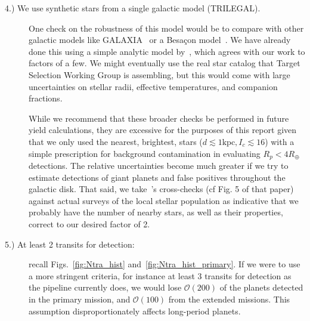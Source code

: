 \begin{description}
	
	\item[4.) We use synthetic stars from a single galactic model (TRILEGAL).]
	One check on the robustness of this model would be to compare with other galactic models like GALAXIA~\citep{sharma_galaxia_2011} or a Besa\c con model~\citep{robin2003synthetic}.
	We have already done this using a simple analytic model by~\citet{winn_searchable_2013}, which agrees with our work to factors of a few.
	We might eventually use the real star catalog that \tesss Target Selection Working Group is assembling, but this would come with large uncertainties on stellar radii, effective temperatures, and companion fractions.
	
	While we recommend that these broader checks be performed in future \tess yield calculations, they are excessive for the purposes of this report given that we only used the nearest, brightest, stars ($d\lesssim\mathrm{1kpc}, I_c\lesssim16$) with a simple prescription for background contamination in evaluating \tesss $R_p<4R_\oplus$ detections.
	The relative uncertainties become much greater if we try to estimate detections of giant planets and false positives throughout the galactic disk.
	That said, we take~'s cross-checks (cf Fig. 5 of that paper) against actual surveys of the local stellar population as indicative that we probably have the number of nearby stars, as well as their properties, correct to our desired factor of 2.
	
	\item[5.) At least 2 transits for detection:] recall Figs.~\ref{fig:Ntra_hist} and~\ref{fig:Ntra_hist_primary}.
	If we were to use a more stringent criteria, for instance at least 3 transits for detection as the \kepler pipeline currently does, we would lose $\mathcal{O}(200)$ of the planets detected in the primary mission, and $\mathcal{O}(100)$ from the extended missions.
	This assumption disproportionately affects long-period planets.
	
	

\end{description}
